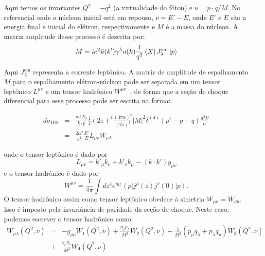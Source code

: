 Aqui temos os invariantes \( Q^2 = -q^2 \) (a virtualidade do fóton) e \( \nu = p \cdot q /M\). No referencial onde o núcleon inicial está em repouso, \( \nu = E' - E \), onde \( E' \) e \( E \) são a energia final e inicial do elétron, respectivamente  e \( M \) é a massa do núcleon.  A matriz amplitude desse processo é descrita por:
\begin{equation}
M = ie^2 \bar{u}(k')\gamma^\lambda u(k) \frac{1}{q^2}\bra{X}J_\lambda^{\text{em}}\ket{p}
\end{equation}

Aqui \( J_\lambda^\text{em}\) representa a corrente leptônica. A matriz de amplitude de espalhamento  \( M\) para o espalhamento elétron-núcleon pode ser separada em um tensor leptônico \( L^{\mu\nu} \) e um tensor hadrônico \( W^{\mu\nu} \)~\cite{griffiths_introduction_2008}, de forma que a seção de choque diferencial para esse processo  pode ser escrita na forma:

\begin{eqnarray}
    d\sigma_{\text{DIS}}& =& \frac{m_e^2 E_p}{k\cdot p}\frac{1}{2} (2\pi)^4 \frac{(4\pi \alpha)^2}{(2\pi)^3}|M|^2 \delta^{(4)}(p'-p-q)\frac{d^3k'}{E'}\nonumber\\
     &=& \frac{2\alpha^2}{q^4}\frac{E'}{E}L_{\mu\nu} W_{\mu\lambda}
     \label{eq:secaoWL}
\end{eqnarray}

onde o tensor  leptônico é dado por
\begin{equation}
    L_{\mu\nu} = k'_\mu k_\nu + k'_\nu k_\mu - (k\cdot k')g_{\mu\nu}
\end{equation}
e o tensor hadrônico é dado por
\begin{equation}
W^{\mu\nu} = \frac{1}{4\pi} \int dz^4 e^{iqz} \left\langle p \right| j^\mu(z)j^\nu(0) \left| p \right\rangle. \tag{1.13}
\end{equation}
O tensor hadrônico assim como tensor leptônico obedece à simetria $W_{\mu\nu} = W_{\nu\mu}$. Isso é imposto pela invariância de paridade  da seção de choque. Neste caso, podemos escrever o tensor hadrônico como:
\begin{eqnarray}
    W_{\mu\lambda}(Q^2, \nu)&= & -g_{\mu\nu} W_1(Q^2, \nu) + \frac{p_\mu p_\lambda}{M^2} W_ 2(Q^2, \nu) + \frac{1}{M^2}(p_\mu q_\lambda +  p_\lambda q_\mu)W_3 (Q^2, \nu)\nonumber\\
     &+& \frac{q_\mu q_\lambda}{M^2} W_4(Q^2, \nu)
     \label{eq:Wmunu}
\end{eqnarray}

